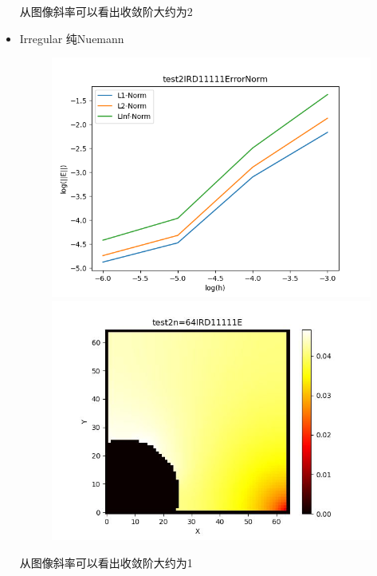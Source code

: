 \documentclass{article}
\begin{document}
\begin{itemize}
    从图像斜率可以看出收敛阶大约为2
    \item Irregular 纯Nuemann
    \begin{figure}[h]
        \centering
        \includegraphics[width=0.35\linewidth]{test2IRD11111ErrorNormjpg.png}
        \includegraphics[width=0.35\linewidth]{test2n=64IRD11111E.jpg}
    \end{figure}

    从图像斜率可以看出收敛阶大约为1
\end{itemize}
\end{document}
